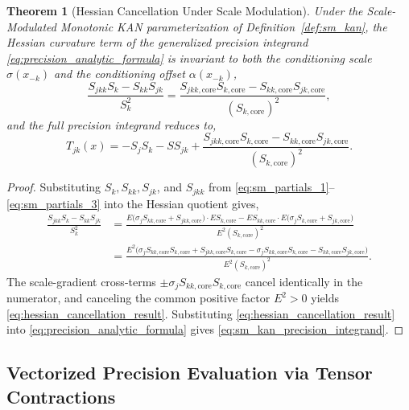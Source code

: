 \documentclass[11pt,a4paper]{article}
\theoremstyle{plain}
\newtheorem{theorem}{Theorem}[section]
\theoremstyle{definition}
\theoremstyle{remark}
\begin{document}
\begin{theorem}[Hessian Cancellation Under Scale Modulation]
\label{thm:hessian_cancellation}
Under the Scale-Modulated Monotonic KAN parameterization of Definition~\ref{def:sm_kan}, the Hessian curvature term of the generalized precision integrand \eqref{eq:precision_analytic_formula} is invariant to both the conditioning scale $\sigma(x_{-k})$ and the conditioning offset $\alpha(x_{-k})$,
\begin{equation}
    \frac{S_{jkk} S_k - S_{kk} S_{jk}}{S_k^2} = \frac{S_{jkk, \text{core}} S_{k, \text{core}} - S_{kk, \text{core}} S_{jk, \text{core}}}{(S_{k, \text{core}})^2},
    \label{eq:hessian_cancellation_result}
\end{equation}
and the full precision integrand reduces to,
\begin{equation}
    T_{jk}(x) = -S_j S_k - S S_{jk} + \frac{S_{jkk, \text{core}} S_{k, \text{core}} - S_{kk, \text{core}} S_{jk, \text{core}}}{(S_{k, \text{core}})^2}.
    \label{eq:sm_kan_precision_integrand}
\end{equation}
\end{theorem}

\begin{proof}
Substituting $S_k, S_{kk}, S_{jk}$, and $S_{jkk}$ from \eqref{eq:sm_partials_1}--\eqref{eq:sm_partials_3} into the Hessian quotient gives,
\begin{align}
    \frac{S_{jkk} S_k - S_{kk} S_{jk}}{S_k^2} &= \frac{E\big(\sigma_j S_{kk, \text{core}} + S_{jkk, \text{core}}\big) \cdot E S_{k, \text{core}} - E S_{kk, \text{core}} \cdot E\big(\sigma_j S_{k, \text{core}} + S_{jk, \text{core}}\big)}{E^2 (S_{k, \text{core}})^2} \nonumber \\
    &= \frac{E^2 \Big( \sigma_j S_{kk, \text{core}} S_{k, \text{core}} + S_{jkk, \text{core}} S_{k, \text{core}} - \sigma_j S_{kk, \text{core}} S_{k, \text{core}} - S_{kk, \text{core}} S_{jk, \text{core}} \Big)}{E^2 (S_{k, \text{core}})^2}.
\end{align}
The scale-gradient cross-terms $\pm \sigma_j S_{kk, \text{core}} S_{k, \text{core}}$ cancel identically in the numerator, and canceling the common positive factor $E^2 > 0$ yields \eqref{eq:hessian_cancellation_result}. Substituting \eqref{eq:hessian_cancellation_result} into \eqref{eq:precision_analytic_formula} gives \eqref{eq:sm_kan_precision_integrand}.
\end{proof}
\subsection{Vectorized Precision Evaluation via Tensor Contractions}
\label{subsec:tensor_contractions}
\end{document}
